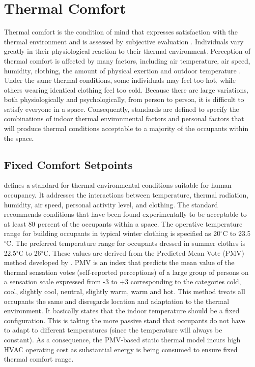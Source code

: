 \section{Thermal Comfort} \label{cha:bg:atc} 

Thermal comfort is the condition of mind that expresses satisfaction with the thermal environment and is assessed by subjective evaluation \citep{ashrae2013thermal}. Individuals vary greatly in their physiological reaction to their thermal environment. Perception of thermal comfort is affected by many factors, including air temperature, air speed, humidity, clothing, the amount of physical exertion and outdoor temperature \citep{bradshaw2010human}. Under the same thermal conditions, some individuals may feel too hot, while others wearing identical clothing feel too cold. Because there are large variations, both physiologically and psychologically, from person to person, it is difficult to satisfy everyone in a space. Consequently, standards are defined to specify the combinations of indoor thermal environmental factors and personal factors that will produce thermal conditions acceptable to a majority of the occupants within the space. 

\subsection{Fixed Comfort Setpoints}

\cite{ashrae2013thermal} defines a standard for thermal environmental conditions suitable for human occupancy. It addresses the interactions between temperature, thermal radiation, humidity, air speed, personal activity level, and clothing. The standard recommends conditions that have been found experimentally to be acceptable to at least 80 percent of the occupants within a space. The operative temperature range for building occupants in typical winter clothing %
 is specified as 20$^\circ$C to 23.5$^\circ$C. The preferred temperature range for occupants dressed in summer clothes %
 is 22.5$^\circ$C to 26$^\circ$C. These values are derived from the Predicted Mean Vote (PMV) method developed by \cite{fanger1970thermal}. PMV is an index that predicts the mean value of the thermal sensation votes (self-reported perceptions) of a large group of persons on a sensation scale expressed from -3 to +3 corresponding to the categories cold, cool, slightly cool, neutral, slightly warm, warm and hot.
This method treats all occupants the same and disregards location and adaptation to the thermal environment. It basically states that the indoor temperature should be a fixed configuration. This is taking the more passive stand that occupants do not have to adapt to different temperatures (since the temperature will always be constant). As a consequence, the PMV-based static thermal model incurs high HVAC operating cost as substantial energy is being consumed to ensure fixed thermal comfort range.

